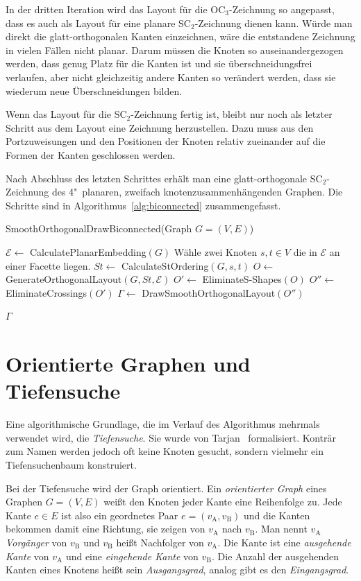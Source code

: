 \documentclass[a4paper]{scrreprt}
\theoremstyle{definition}
\newcommand{\Epsilon}{\mathcal{E}}
\begin{document}
In der dritten Iteration wird das Layout für die OC$_3$-Zeichnung so angepasst, dass es auch als Layout für eine planare SC$_2$-Zeichnung dienen kann. Würde man direkt die glatt-orthogonalen Kanten einzeichnen, wäre die entstandene Zeichnung in vielen Fällen nicht planar. Darum müssen die Knoten so auseinandergezogen werden, dass genug Platz für die Kanten ist und sie überschneidungsfrei verlaufen, aber nicht gleichzeitig andere Kanten so verändert werden, dass sie wiederum neue Überschneidungen bilden.

Wenn das Layout für die SC$_2$-Zeichnung fertig ist, bleibt nur noch als letzter Schritt aus dem Layout eine Zeichnung herzustellen. Dazu muss aus den Portzuweisungen und den Positionen der Knoten relativ zueinander auf die Formen der Kanten geschlossen werden.

Nach Abschluss des letzten Schrittes erhält man eine glatt-orthogonale SC$_2$-Zeichnung des 4"~planaren, zweifach knotenzusammenhängenden Graphen. Die Schritte sind in Algorithmus~\ref{alg:biconnected} zusammengefasst.

\begin{algorithm}[ht]
  \caption{SmoothOrthogonalDrawBiconnected(Graph $G = (V,E)$)}
  \label{alg:biconnected}
  
  $\Epsilon \leftarrow$ CalculatePlanarEmbedding$(G)$ \;
  Wähle zwei Knoten $s, t \in V$ die in $\Epsilon$ an einer Facette liegen.\;
  $St \leftarrow$ CalculateStOrdering$(G, s, t)$ \;
  $O \leftarrow$ GenerateOrthogonalLayout$(G,St,\Epsilon)$ \;
  $O' \leftarrow$ EliminateS-Shapes$(O)$ \;
  $O'' \leftarrow$ EliminateCrossings$(O')$ \;
  $\Gamma \leftarrow$ DrawSmoothOrthogonalLayout$(O'')$ \;
  
  \Return $\Gamma$
\end{algorithm}

\section{Orientierte Graphen und Tiefensuche}

Eine algorithmische Grundlage, die im Verlauf des Algorithmus mehrmals verwendet wird, die \emph{Tiefensuche}. Sie wurde von Tarjan~\cite{tarjan-72} formalisiert. Konträr zum Namen werden jedoch oft keine Knoten gesucht, sondern vielmehr ein Tiefensuchenbaum konstruiert.

Bei der Tiefensuche wird der Graph orientiert. Ein \emph{orientierter Graph} eines Graphen $G = (V, E)$ weißt den Knoten jeder Kante eine Reihenfolge zu. Jede Kante $e \in E$ ist also ein geordnetes Paar $e = (v_\text{A}, v_\text{B})$ und die Kanten bekommen damit eine Richtung, sie zeigen von $v_\text{A}$ nach $v_\text{B}$. Man nennt $v_\text{A}$ \emph{Vorgänger} von $v_\text{B}$ und $v_\text{B}$ heißt Nachfolger von $v_\text{A}$. Die Kante ist eine \emph{ausgehende Kante} von $v_\text{A}$ und eine \emph{eingehende Kante} von $v_\text{B}$. Die Anzahl der ausgehenden Kanten eines Knotens heißt sein \emph{Ausgangsgrad}, analog gibt es den \emph{Eingangsgrad}.
\end{document}

